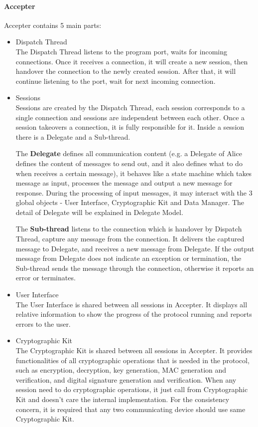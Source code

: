 \paragraph{Accepter}
Accepter contains 5 main parts:
\begin{itemize}
\item Dispatch Thread \\
The Dispatch Thread listens to the program port, waits for incoming connections. Once it receives a connection, it will create a new session, then handover the connection to the newly created session. After that, it will continue listening to the port, wait for next incoming connection.

\item Sessions \\
Sessions are created by the Dispatch Thread, each session corresponds to a single connection and sessions are independent between each other. Once a session takeovers a connection, it is fully responsible for it. Inside a session there is a Delegate and a Sub-thread. 
\par The \textbf{Delegate} defines all communication content (e.g. a Delegate of Alice defines the content of messages to send out, and it also defines what to do when receives a certain message), it behaves like a state machine which takes message as input, processes the message and output a new message for response. During the processing of input messages, it may interact with the 3 global objects - User Interface, Cryptographic Kit and Data Manager. The detail of Delegate will be explained in Delegate Model.
\par The \textbf{Sub-thread} listens to the connection which is handover by Dispatch Thread, capture any message from the connection. It delivers the captured message to Delegate, and receives a new message from Delegate. If the output message from Delegate does not indicate an exception or termination, the Sub-thread sends the message through the connection, otherwise it reports an error or terminates.

\item User Interface \\
The User Interface is shared between all sessions in Accepter. It displays all relative information to show the progress of the protocol running and reports errors to the user.

\item Cryptographic Kit \\
The Cryptographic Kit is shared between all sessions in Accepter. It provides functionalities of all cryptographic operations that is needed in the protocol, such as encryption, decryption, key generation, MAC generation and verification, and digital signature generation and verification. When any session need to do cryptographic operations, it just call from Cryptographic Kit and doesn't care the internal implementation. For the consistency concern, it is required that any two communicating device should use same Cryptographic Kit.


\end{itemize}
